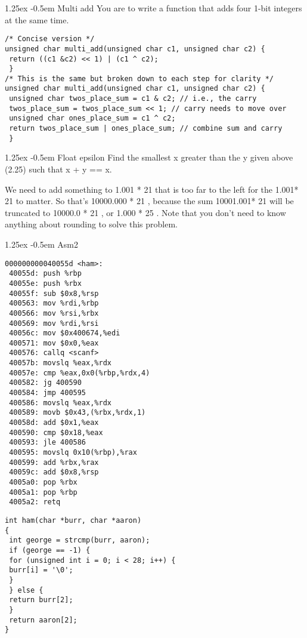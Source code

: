 \documentclass[10pt]{article}
\makeatletter
\newlength{\norm}
\newlength{\nrm}
\newlength{\sm}
\renewcommand{\paragraph}{%
  \@startsection{paragraph}{4}%
  {\z@}{1.25ex \@plus 2pt \@minus 2pt}{-0.5em}%
  {\fontsize{\f@size}{\nrm}\normalfont\bfseries}%
}
\makeatother
\begin{document}
{\begin{multicols*}{5}
\paragraph{Multi add}
You are to write a function that adds four 1-bit integers at the same time.

\begin{lstlisting}[breaklines=true,columns=fullflexible]
/* Concise version */
unsigned char multi_add(unsigned char c1, unsigned char c2) {
 return ((c1 &c2) << 1) | (c1 ^ c2);
 }
/* This is the same but broken down to each step for clarity */
unsigned char multi_add(unsigned char c1, unsigned char c2) {
 unsigned char twos_place_sum = c1 & c2; // i.e., the carry
 twos_place_sum = twos_place_sum << 1; // carry needs to move over
 unsigned char ones_place_sum = c1 ^ c2;
 return twos_place_sum | ones_place_sum; // combine sum and carry
 }
 \end{lstlisting}

\paragraph{Float epsilon}
Find the smallest x greater than the y given above (2.25) such that x + y == x. 

We need to add something to 1.001 * 21
that is too far to the left for the 1.001* 21
to matter. So that’s 10000.000 * 21
, because the sum 10001.001* 21 will be
truncated to 10000.0 * 21
, or 1.000 * 25
. Note that you don’t need to know anything
about rounding to solve this problem.

\paragraph{Asm2}
\begin{lstlisting}[breaklines=true,columns=fullflexible]
000000000040055d <ham>:
 40055d: push %rbp
 40055e: push %rbx
 40055f: sub $0x8,%rsp
 400563: mov %rdi,%rbp
 400566: mov %rsi,%rbx
 400569: mov %rdi,%rsi
 40056c: mov $0x400674,%edi
 400571: mov $0x0,%eax
 400576: callq <scanf>
 40057b: movslq %eax,%rdx
 40057e: cmp %eax,0x0(%rbp,%rdx,4)
 400582: jg 400590
 400584: jmp 400595
 400586: movslq %eax,%rdx
 400589: movb $0x43,(%rbx,%rdx,1)
 40058d: add $0x1,%eax
 400590: cmp $0x18,%eax
 400593: jle 400586
 400595: movslq 0x10(%rbp),%rax
 400599: add %rbx,%rax
 40059c: add $0x8,%rsp
 4005a0: pop %rbx
 4005a1: pop %rbp
 4005a2: retq
\end{lstlisting}

\begin{lstlisting}[breaklines=true,columns=fullflexible]
int ham(char *burr, char *aaron)
{
 int george = strcmp(burr, aaron);
 if (george == -1) {
 for (unsigned int i = 0; i < 28; i++) {
 burr[i] = '\0';
 }
 } else {
 return burr[2];
 }
 return aaron[2];
}
\end{lstlisting}


\end{multicols*}}
\end{document}
